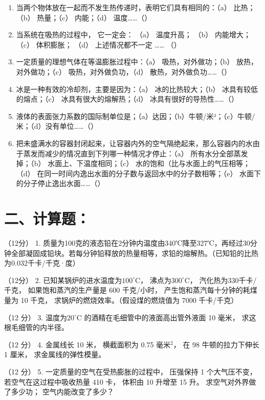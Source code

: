 \begin{enumerate}
\def\labelenumi{\arabic{enumi}.}
\item
  当两个物体放在一起而不发生热传递时，表明它们具有相同的：（a）
  比热；（b） 热量；（c） 内能；（d） 温度\ldots\ldots（）
\item
  当系统在吸热的过程中， 它一定会： （a） 温度升高； （b） 内能增大；
  （c） 体积膨胀； （d） 上述情况都不一定 \ldots\ldots{} （）
\item
  一定质量的理想气体在等温膨胀过程中：（a） 吸热，对外做功；（b）
  放热，对外做功；（c） 吸热，对外做负功，（d）
  散热，对外做负功\ldots\ldots（）
\item
  冰是一种有效的冷却剂，主要是因为：（a） 冰的比热较大；（b）
  冰具有较低的熔点；（c） 冰具有很大的熔解热；（d）
  冰具有很好的导热性\ldots\ldots（）
\item
  液体的表面张力系数的国际制单位是；（a）达因；（b）牛顿/米²；（c）牛顿/米；（d）没有单位\ldots\ldots（）
\item
  把未盛满水的容器封闭起来，让容器内外的空气隔绝起来，那么容器内的水由于蒸发而减少的情况直到下列哪一种情况才停止：（a）
  所有水分全部蒸发掉；（b） 水面上、下温度相同；（c）
  水的饱和（比与水面上的气压相等；（d）
  在同一时间内逸出水面的分子数与返回水中的分子数相等；（e）
  水面下的分子停止逸出水面\ldots\ldots（）
\end{enumerate}

\section{二、计算题：}\label{ux4e8cux8ba1ux7b97ux9898}

（12分） 1.
质量为100克的液态铅在2分钟内温度由340℃降至327℃，再经过30分钟全部凝固成铅块。若每分钟铅释放的热量相等，求铅的熔解热。（已知铅的比热为0.032千卡/千克·度）

（12分） 2. 已知某锅炉的进水温度为\(100^{\circ} \mathrm{C}\)，
沸点为\(300^{\circ} \mathrm{C}\)， 汽化热为\(330\)千卡/千克，
如果饱和蒸汽的生产量是 600 千克/小时， 产生饱和蒸汽每十分钟的耗煤量为 10
千克， 求锅炉的燃烧效率。（假设煤的燃烧值为 7000 千卡/千克）

（12 分） 3. 温度为\(20^{\circ}\)C 的酒精在毛细管中的液面高出管外液面 10
毫米， 求这根毛细管的内半径。

（12 分） 4. 金属线长 10 米， 横截面积为 0.75 毫米\(^{2}\)， 在 98
牛顿的拉力下伸长 1 厘米， 求金属线的弹性模量。

（12 分） 5. 一定质量的空气在受热膨胀的过程中， 压强保持 1
个大气压不变， 若空气在这过程中吸收热量 410 卡， 体积由 10 升增至 15
升。 求空气对外界做了多少功； 空气内能改变了多少？

